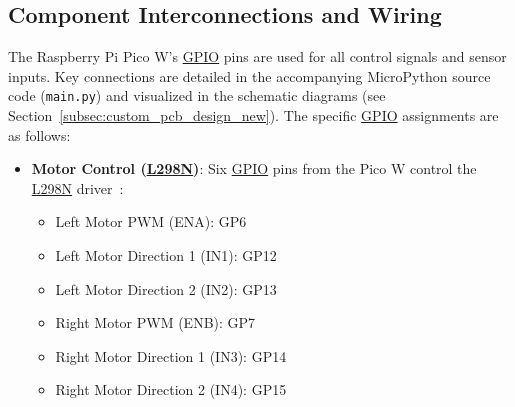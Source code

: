 \subsection{Component Interconnections and Wiring}
\label{subsec:component_interconnections_wiring_new}
The Raspberry Pi Pico W’s \hyperref[term:gpio]{GPIO} pins are used for all control signals and sensor inputs. Key connections are detailed in the accompanying MicroPython source code (\texttt{main.py}) and visualized in the schematic diagrams (see Section~\ref{subsec:custom_pcb_design_new}). The specific \hyperref[term:gpio]{GPIO} assignments are as follows:

\begin{itemize}
    \item \textbf{Motor Control (\hyperref[term:l298n]{L298N})}: Six \hyperref[term:gpio]{GPIO} pins from the Pico W control the \hyperref[term:l298n]{L298N} driver~\cite{L298NDatasheet}:
        \begin{itemize}
            \item Left Motor PWM (ENA): GP6
            \item Left Motor Direction 1 (IN1): GP12
            \item Left Motor Direction 2 (IN2): GP13
            \item Right Motor PWM (ENB): GP7
            \item Right Motor Direction 1 (IN3): GP14
            \item Right Motor Direction 2 (IN4): GP15
        \end{itemize}


\end{itemize}
